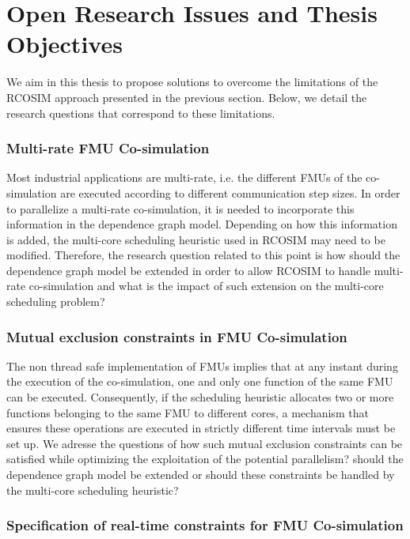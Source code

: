 \section{Open Research Issues and Thesis Objectives}

We aim in this thesis to propose solutions to overcome the limitations of the RCOSIM approach presented in the previous section. Below, we detail the research questions that correspond to these limitations.

\subsubsection{Multi-rate FMU Co-simulation}

Most industrial applications are multi-rate, i.e. the different FMUs of the co-simulation are executed according to different communication step sizes. In order to parallelize a multi-rate co-simulation, it is needed to incorporate this information in the dependence graph model. Depending on how this information is added, the multi-core scheduling heuristic used in RCOSIM may need to be modified. Therefore, the research question related to this point is how should the dependence graph model be extended in order to allow RCOSIM to handle multi-rate co-simulation and what is the impact of such extension on the multi-core scheduling problem?

\subsubsection{Mutual exclusion constraints in FMU Co-simulation}

The non thread safe implementation of FMUs implies that at any instant during the execution of the co-simulation, one and only one function of the same FMU can be executed. Consequently, if the scheduling heuristic allocates two or more functions belonging to the same FMU to different cores, a mechanism that ensures these operations are executed in strictly different time intervals must be set up. We adresse the questions of how such mutual exclusion constraints can be satisfied while optimizing the exploitation of the potential parallelism? should the dependence graph model be extended or should these constraints be handled by the multi-core scheduling heuristic?

\subsubsection{Specification of real-time constraints for FMU Co-simulation}

